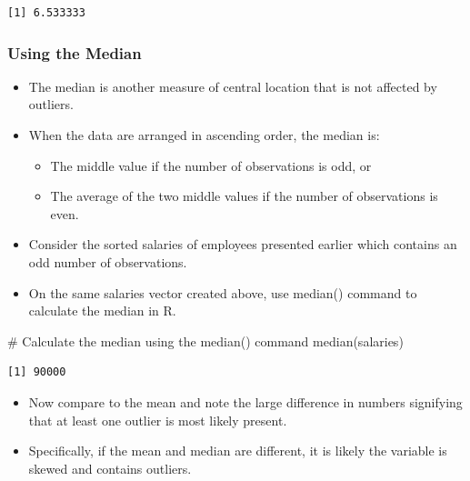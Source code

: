 \documentclass[
  letterpaper,
  DIV=11,
  numbers=noendperiod]{scrreprt}
\newenvironment{Shaded}{\begin{snugshade}}{\end{snugshade}}
\newcommand{\CommentTok}[1]{\textcolor[rgb]{0.37,0.37,0.37}{#1}}
\newcommand{\FunctionTok}[1]{\textcolor[rgb]{0.28,0.35,0.67}{#1}}
\newcommand{\NormalTok}[1]{\textcolor[rgb]{0.00,0.23,0.31}{#1}}
\providecommand{\tightlist}{%
  \setlength{\itemsep}{0pt}\setlength{\parskip}{0pt}}\usepackage{longtable,booktabs,array}
\begin{document}
\begin{verbatim}
[1] 6.533333
\end{verbatim}

\subsubsection{Using the Median}\label{using-the-median}

\begin{itemize}
\tightlist
\item
  The median is another measure of central location that is not affected
  by outliers.
\item
  When the data are arranged in ascending order, the median is:

  \begin{itemize}
  \tightlist
  \item
    The middle value if the number of observations is odd, or
  \item
    The average of the two middle values if the number of observations
    is even.
  \end{itemize}
\item
  Consider the sorted salaries of employees presented earlier which
  contains an odd number of observations.\\
\item
  On the same salaries vector created above, use median() command to
  calculate the median in R.
\end{itemize}

\begin{Shaded}
\begin{Highlighting}[]
\CommentTok{\# Calculate the median using the median() command}
\FunctionTok{median}\NormalTok{(salaries)}
\end{Highlighting}
\end{Shaded}

\begin{verbatim}
[1] 90000
\end{verbatim}

\begin{itemize}
\tightlist
\item
  Now compare to the mean and note the large difference in numbers
  signifying that at least one outlier is most likely present.
\item
  Specifically, if the mean and median are different, it is likely the
  variable is skewed and contains outliers.
\end{itemize}
\end{document}
